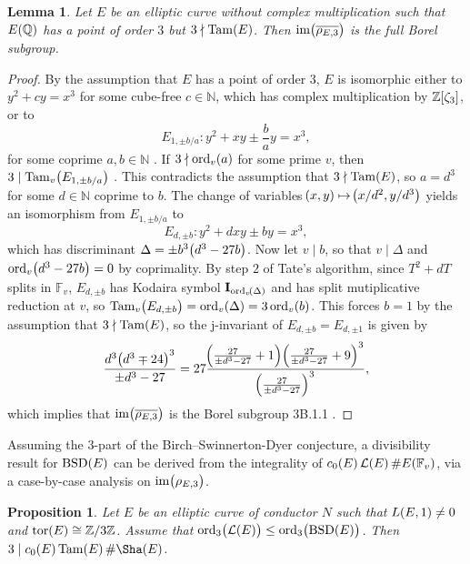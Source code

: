 \documentclass{article}
\theoremstyle{plain}
\newtheorem{lemma}[n]{Lemma}
\newtheorem{proposition}[n]{Proposition}
\theoremstyle{definition}
\newcommand{\BSD}{\operatorname{BSD}}
\newcommand{\FF}{\mathbb{F}}
\newcommand{\im}{\operatorname{im}}
\newcommand{\LLL}{\mathcal{L}}
\newcommand{\NN}{\mathbb{N}}
\newcommand{\ord}{\operatorname{ord}}
\newcommand{\QQ}{\mathbb{Q}}
\newcommand{\Tam}{\operatorname{Tam}}
\newcommand{\tor}{\operatorname{tor}}
\newcommand{\ZZ}{\mathbb{Z}}
\newcommand{\br}{\!\del}
\begin{document}
\begin{lemma}
\label{lem:borel}
Let $ E $ be an elliptic curve without complex multiplication such that $ E\br{\QQ} $ has a point of order $ 3 $ but $ 3 \nmid \Tam\br{E} $. Then $ \im\br{\overline{\rho_{E, 3}}} $ is the full Borel subgroup.
\end{lemma}

\begin{proof}
By the assumption that $ E $ has a point of order $ 3 $, $ E $ is isomorphic either to $ y^2 + cy = x^3 $ for some cube-free $ c \in \NN $, which has complex multiplication by $ \ZZ\sbr{\zeta_3} $, or to
$$ E_{1, \pm b / a} : y^2 + xy \pm \dfrac{b}{a}y = x^3, $$
for some coprime $ a, b \in \NN $ \cite[Proposition 2.4]{BR22}. If $ 3 \nmid \ord_v\br{a} $ for some prime $ v $, then $ 3 \mid \Tam_v\br[1]{E_{1, \pm b / a}} $ \cite[Theorem 3.5]{BR22}. This contradicts the assumption that $ 3 \nmid \Tam\br{E} $, so $ a = d^3 $ for some $ d \in \NN $ coprime to $ b $. The change of variables $ \br{x, y} \mapsto \br{x / d^2, y / d^3} $ yields an isomorphism from $ E_{1, \pm b / a} $ to
$$ E_{d, \pm b} : y^2 + dxy \pm by = x^3, $$
which has discriminant $ \Delta = \pm b^3\br{d^3 - 27b} $. Now let $ v \mid b $, so that $ v \mid \Delta $ and $ \ord_v\br{d^3 - 27b} = 0 $ by coprimality. By step $ 2 $ of Tate's algorithm, since $ T^2 + dT $ splits in $ \FF_v $, $ E_{d, \pm b} $ has Kodaira symbol $ \textbf{I}_{\ord_v\br{\Delta}} $ and has split mutiplicative reduction at $ v $, so $ \Tam_v\br{E_{d, \pm b}} = \ord_v\br{\Delta} = 3\ord_v\br{b} $. This forces $ b = 1 $ by the assumption that $ 3 \nmid \Tam\br{E} $, so the j-invariant of $ E_{d, \pm b} = E_{d, \pm1} $ is given by
$$ \dfrac{d^3\br{d^3 \mp 24}^3}{\pm d^3 - 27} = 27\dfrac{\br{\tfrac{27}{\pm d^3 - 27} + 1}\br{\tfrac{27}{\pm d^3 - 27} + 9}^3}{\br{\tfrac{27}{\pm d^3 - 27}}^3}, $$
which implies that $ \im\br{\overline{\rho_{E, 3}}} $ is the Borel subgroup 3B.1.1 \cite[Theorem 1.2]{Zyw15}.
\end{proof}

Assuming the $ 3 $-part of the Birch--Swinnerton-Dyer conjecture, a divisibility result for $ \BSD\br{E} $ can be derived from the integrality of $ c_0\br{E}\LLL\br{E}\#E\br{\FF_v} $, via a case-by-case analysis on $ \im\br{\rho_{E, 3}} $.

\begin{proposition}
\label{prop:divide}
Let $ E $ be an elliptic curve of conductor $ N $ such that $ L\br{E, 1} \ne 0 $ and $ \tor\br{E} \cong \ZZ / 3\ZZ $. Assume that $ \ord_3\br{\LLL\br{E}} \le \ord_3\br{\BSD\br{E}} $. Then $ 3 \mid c_0\br{E}\Tam\br{E}\#\Sha\br{E} $.
\end{proposition}
\end{document}
